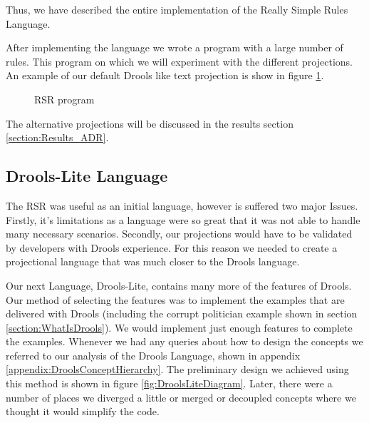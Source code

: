 Thus, we have described the entire implementation of the Really Simple Rules Language.

After implementing the language we wrote a program with a large number of rules.
This program on which we will experiment with the different projections.
An example of our default Drools like text projection is show in figure \ref{fig:RSRProgram}.

\begin{figure}[h]
    \centering
    \caption{RSR program}
    \label{fig:RSRProgram}
\end{figure}

The alternative projections will be discussed in the results section \ref{section:Results_ADR}.

\subsection{Drools-Lite Language}
\label{section:DroolsLite}

The RSR was useful as an initial language, however is suffered two major Issues.
Firstly, it's limitations as a language were so great that it was not able to handle many necessary scenarios.
Secondly, our projections would have to be validated by developers with Drools experience.
For this reason we needed to create a projectional language that was much closer to the Drools language.

Our next Language, Drools-Lite, contains many more of the features of Drools.
Our method of selecting the features was to implement the examples that are delivered with Drools (including the corrupt politician example shown in section \ref{section:WhatIsDrools}).
We would implement just enough features to complete the examples.
Whenever we had any queries about how to design the concepts we referred to our analysis of the Drools Language, shown in appendix \ref{appendix:DroolsConceptHierarchy}.
The preliminary design we achieved using this method is shown in figure \ref{fig:DroolsLiteDiagram}.
Later, there were a number of places we diverged a little or merged or decoupled concepts where we thought it would simplify the code.

